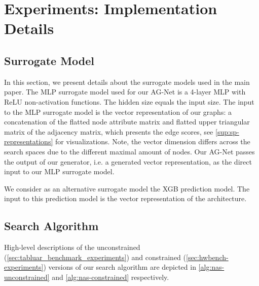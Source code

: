 \documentclass[runningheads]{llncs}
\begin{document}
\section{Experiments: Implementation Details}
\label{sup:implementation-details}

\subsection{Surrogate Model}
In this section, we present details about the surrogate models used in the main paper.
The MLP surrogate model used for our AG-Net is a 4-layer MLP with ReLU non-activation functions.
The hidden size equals the input size.
The input to the MLP surrogate model is the vector representation  of our graphs: a concatenation of the flatted node attribute matrix and flatted upper triangular matrix of the adjacency matrix, which presents the edge scores, see \autoref{sup:sp-representations} for visualizations.
Note, the vector dimension  differs across the search spaces due to the different maximal amount of nodes.
Our AG-Net passes the output of our generator, i.e. a generated vector representation, as the direct input to our MLP surrogate model.

We consider as an alternative surrogate model the XGB \cite{XGB} prediction model.
The input to this prediction model is the vector representation of the architecture.


\subsection{Search Algorithm}

High-level descriptions of the unconstrained (\autoref{sec:tabluar_benchmark_experiments}) and constrained (\autoref{sec:hwbench-experiments}) versions of our search algorithm are depicted in \autoref{alg:nas-unconstrained} and \autoref{alg:nas-constrained} respectively.
\end{document}
